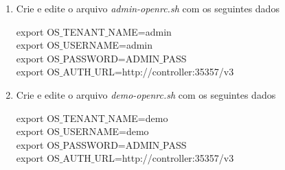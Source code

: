 		\begin{enumerate}
			\item Crie e edite o arquivo \emph{admin-openrc.sh} com os seguintes dados
			\begin{snugshade}
				export OS$\_$TENANT$\_$NAME=admin \\
				export OS$\_$USERNAME=admin \\
				export OS$\_$PASSWORD=ADMIN$\_$PASS \\
				export OS$\_$AUTH$\_$URL=http://controller:35357/v3 \\
			\end{snugshade}
			
			\item Crie e edite o arquivo \emph{demo-openrc.sh} com os seguintes dados
			\begin{snugshade}
				export OS$\_$TENANT$\_$NAME=demo \\
				export OS$\_$USERNAME=demo \\
				export OS$\_$PASSWORD=ADMIN$\_$PASS \\
				export OS$\_$AUTH$\_$URL=http://controller:35357/v3 \\
			\end{snugshade}
		\end{enumerate}